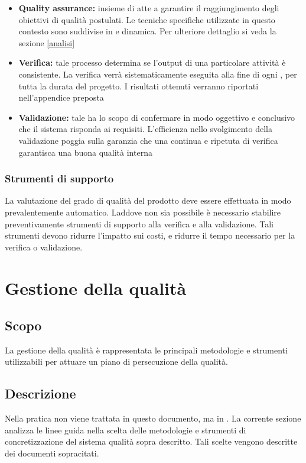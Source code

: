 \documentclass[12pt,a4paper]{article}
\begin{document}
\begin{itemize}
	\item \textbf{Quality assurance:} insieme di  atte a garantire il raggiungimento degli obiettivi di qualità postulati. Le tecniche specifiche utilizzate in questo contesto sono suddivise in  e dinamica. Per ulteriore dettaglio si veda la sezione \ref{analisi}
	\item \textbf{Verifica:} tale processo determina se l'output di una particolare attività è consistente. La verifica verrà sistematicamente eseguita alla fine di ogni , per tutta la durata del progetto. I risultati ottenuti verranno riportati nell'appendice preposta
	\item \textbf{Validazione:} tale   ha lo scopo di confermare in modo oggettivo e conclusivo che il sistema risponda ai requisiti. L'efficienza nello svolgimento della validazione poggia sulla garanzia che una continua e ripetuta  di verifica garantisca una buona qualità interna
\end{itemize}

\subsubsection{Strumenti di supporto}
La valutazione del grado di qualità del prodotto deve essere effettuata in modo prevalentemente automatico. Laddove non sia possibile è necessario stabilire preventivamente strumenti di supporto alla verifica e alla validazione. Tali strumenti devono ridurre l'impatto sui costi, e ridurre il tempo necessario per la verifica o validazione. 

\section{Gestione della qualità} \label{gest_qual}

\subsection{Scopo}
La gestione della qualità è rappresentata le principali metodologie e strumenti utilizzabili per attuare un piano di persecuzione della qualità. 

\subsection{Descrizione}
Nella pratica non viene trattata in questo documento, ma in \NdP. La corrente sezione analizza le linee guida nella scelta delle metodologie e strumenti di concretizzazione del sistema qualità sopra descritto. Tali scelte vengono descritte dei documenti sopracitati.
\end{document}
